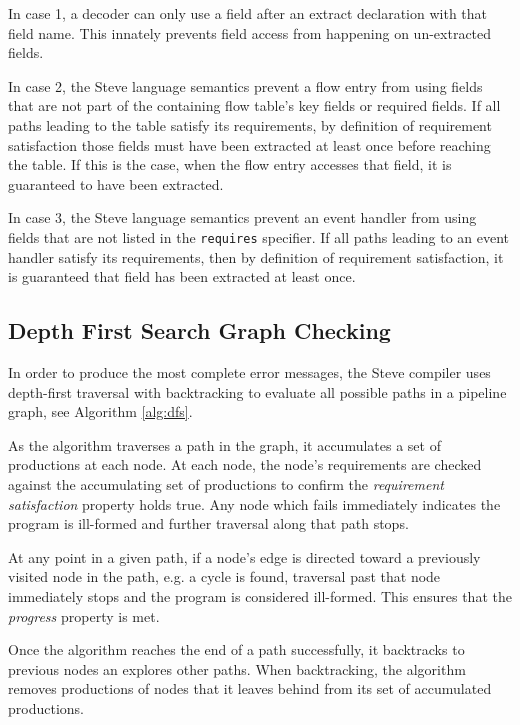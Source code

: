 In case 1, a decoder can only use a field after an extract declaration with
that field name. This innately prevents field access from happening on
un-extracted fields.

In case 2, the Steve language semantics prevent a flow entry from using
fields that are not part of the containing flow table's key fields or
required fields. If all paths leading to the table satisfy its requirements,
by definition of requirement satisfaction those fields must have been extracted at least once before
reaching the table. If this is the case, when the flow entry accesses that
field, it is guaranteed to have been extracted.

In case 3, the Steve language semantics prevent an event handler from using fields
that are not listed in the \texttt{requires} specifier. If all paths
leading to an event handler satisfy its requirements, then by definition of requirement
satisfaction, it is guaranteed that field has been extracted at least once.

\subsection{Depth First Search Graph Checking} \label{guide:dfs_desc}

In order to produce the most complete error messages, the Steve compiler uses depth-first traversal with backtracking to evaluate all possible paths in a pipeline graph, see Algorithm \ref{alg:dfs}. 

As the algorithm traverses a path in the graph, it accumulates a set of productions at each node. At each node, the node's requirements are checked against the accumulating set of productions to confirm the \textit{requirement satisfaction} property holds true. Any node which fails immediately indicates the program is ill-formed and further traversal along that path stops.

At any point in a given path, if a node's edge is directed toward a previously visited node in the path, e.g. a cycle is found, traversal past that node immediately stops and the program is considered ill-formed. This ensures that the \textit{progress} property is met.

Once the algorithm reaches the end of a path successfully, it backtracks to previous
nodes an explores other paths. When backtracking, the algorithm removes
productions of nodes that it leaves behind from its set of accumulated productions.

